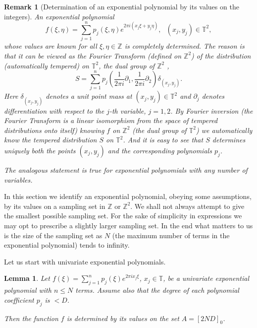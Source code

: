 \documentclass[12pt,a4paper,oneside]{amsart}
\newtheorem{lemma}{Lemma}[section]
\newtheorem{remark}{Remark}[section]
\theoremstyle{definition}
\newcommand{\ZZ}{{\mathbb Z}}
\newcommand{\TT}{{\mathbb T}}
\newcommand{\red}[1]{{#1}}
\newcounter{rem}
\begin{document}
\begin{remark}[Determination of an exponential polynomial by its values on the integers]\label{fourier-inversion}
An exponential polynomial
$$
f(\xi, \eta) = \sum_{j=1}^n p_j(\xi, \eta) e^{2\pi i (x_j \xi + y_j \eta)}\red{,\ \ \ (x_j, y_j) \in \TT^2,}
$$
whose values are known for all $\xi, \eta \in \ZZ$ is completely determined. The reason is that it can be viewed as the Fourier Transform (defined on $\ZZ^2$) of the distribution (automatically tempered) on $\TT^2$, the dual group of $\ZZ^2$ \cite{rudin1962groups},
\begin{equation}\label{distribution}
S = \sum_{j=1}^n p_j\left(\frac{1}{2\pi i} \partial_1, \frac{1}{2\pi i} \partial_2\right) \delta_{(x_j, y_j)}.
\end{equation}
Here $\delta_{(x_j, y_j)}$ denotes a unit point mass at $(x_j, y_j) \in \TT^2$ and $\partial_j$ denotes differentiation with respect to the $j$-th variable, $j=1,2$.
By Fourier inversion (the Fourier Transform is a linear isomorphism from the space of tempered distributions onto itself) knowing $f$ on $\ZZ^2$ (the dual group of $\TT^2$) we automatically know the tempered distribution $S$ on $\TT^2$. And it is easy to see that $S$ determines uniquely both the points $(x_j, y_j)$ and the corresponding polynomials $p_j$.

The analogous statement is true for exponential polynomials with any number of variables.
\end{remark}


In this section we identify an exponential polynomial, obeying some assumptions, by its values on a sampling set in $\ZZ$ or $\ZZ^2$. We shall not always attempt to give the smallest possible sampling set. For the sake of simplicity in expressions we may opt to prescribe a slightly larger sampling set. In the end what matters to us is the size of the sampling set as $N$ (the maximum number of terms in the exponential polynomial) tends to infinity.

Let us start with univariate exponential polynomials.
\begin{lemma}\label{recurrence}
Let $f(\xi) = \sum_{j=1}^n p_j(\xi) e^{2\pi i x_j \xi}$\red{, $x_j \in \TT$,} be a univariate exponential polynomial with $n \le N$ terms. Assume also that the degree of each polynomial coefficient $p_j$ is $< D$.

Then the function $f$ is determined by its values on the set $A = [2ND]_0$.
\end{lemma}
\end{document}
